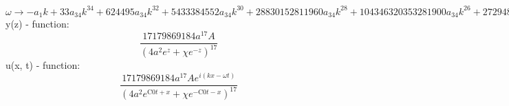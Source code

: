 \documentclass[12pt,a4paper,draft]{article}
\begin{document}
$\omega \to -a_{1} k+33 a_{34} k^{34}+624495 a_{34} k^{32}+5433384552 a_{34} k^{30}+28830152811960 a_{34} k^{28}+104346320353281900 a_{34} k^{26}+272948020077891798900 a_{34} k^{24}+533335296776877450064440 a_{34} k^{22}+793374551951913931557911400 a_{34} k^{20}+907124695478508101903353571670 a_{34} k^{18}+798920491036445986312921537358250 a_{34} k^{16}+539411265040023079382467515521689752 a_{34} k^{14}+275735320438574053686776736144669364680 a_{34} k^{12}+104311384050597693842128877269785359431308 a_{34} k^{10}+28086046552179498690619605315163730708321940 a_{34} k^8+5017451745433054958537184828354914642000475720 a_{34} k^6+512179038810993275273675042626917631825673199000 a_{34} k^4+17627824533858038026038148880245885519100800100625 a_{34} k^2-831075336312307681886333504833057977075395375390625 a_{34}$\\


y(z) - function:
$$
\frac{17179869184 a^{17} A}{\left(4 a^2 e^z+\chi  e^{-z}\right)^{17}}
$$
u(x, t) - function:
$$
\frac{17179869184 a^{17} A e^{i (k x-\omega  t)}}{\left(4 a^2 e^{\text{C0} t+x}+\chi  e^{-\text{C0} t-x}\right)^{17}}
$$
\end{document}
